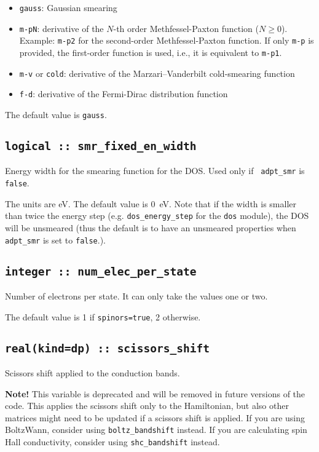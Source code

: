 \begin{itemize}
  
\item
  {\tt gauss}: Gaussian smearing

\item
  {\tt m-pN}: derivative of the $N$-th order
    Methfessel-Paxton function ($N\geq 0$). Example: {\tt m-p2} for the
  second-order Methfessel-Paxton function. If only {\tt m-p} is
  provided, the first-order function is used, i.e., it is equivalent to {\tt m-p1}.

\item
  {\tt m-v} or {\tt cold}: derivative of the Marzari--Vanderbilt cold-smearing function

\item
  {\tt f-d}: derivative of the Fermi-Dirac distribution function

\end{itemize}

The default value is {\tt gauss}.

\subsection[smr\_fixed\_en\_width]{\tt logical :: smr\_fixed\_en\_width}
Energy width for the smearing function for the DOS. Used only if {\tt
  adpt\_smr} is \verb#false#.

The units are eV. The default value is 0~eV. Note that if the width is
smaller than twice the energy step (e.g. {\tt dos\_energy\_step} for
the {\tt dos} module), the DOS
will be unsmeared (thus the default is to have an unsmeared
properties when {\tt  adpt\_smr} is set to \verb#false#.).


  \subsection{\tt integer :: num\_elec\_per\_state} 
Number of electrons per state. It can only take the values one or
two.

The default value is 1 if {\tt spinors=true}, 2 otherwise.

  \subsection{\tt real(kind=dp) :: scissors\_shift} 
Scissors shift applied to the conduction bands.

\textbf{Note!} This variable is deprecated and will be removed in future
versions of the code. This applies the scissors shift only to the Hamiltonian,
but also other matrices might need to be updated if a scissors shift is 
applied. If you are using BoltzWann, consider using \texttt{boltz\_bandshift} instead. 
If you are calculating spin Hall conductivity, consider using \texttt{shc\_bandshift} instead.

